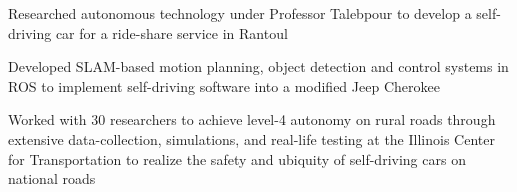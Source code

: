 \begin{cvitemize}
\item Researched autonomous technology under Professor Talebpour to develop a self-driving car for a ride-share service in Rantoul
\item Developed SLAM-based motion planning, object detection and control systems in ROS to implement self-driving software into a modified Jeep Cherokee
\item Worked with 30 researchers to achieve level-4 autonomy on rural roads through extensive data-collection, simulations, and real-life testing at the Illinois Center for Transportation to realize the safety and ubiquity of self-driving cars on national roads
\end{cvitemize}
